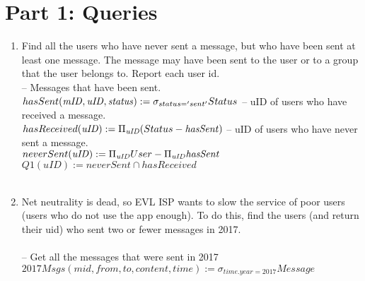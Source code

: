 \documentclass{article}
\newcommand{\var}[1]{\mathit{#1}}
\begin{document}
\section*{Part 1: Queries}

\begin{enumerate}

\item   %
Find all the users who have never sent a message, but who have been sent at least one message. The message may have been sent to the user or to a group that the user belongs to. Report each user id. \\

{\large %
--  Messages that have been sent. \\ [5pt]
$
hasSent(\var{mID}, \var{uID}, \var{status}) :=  
	\sigma_{status = 'sent'} 
	Status \\[10pt]
$
-- uID of users who have received a message. \\[5pt]
$
hasReceived(\var{uID}) := 
	\Pi_{\var{uID}} 
	(Status - \var{hasSent}) 
	\\[10pt]
$
-- uID of users who have never sent a message. \\[5pt]
$
neverSent(\var{uID}) := 
	\Pi_{\var{uID}} User - \Pi_\var{uID}\var{hasSent} 
	\\[10pt]
$
$
Q1(\var{uID}) :=
	neverSent \cap hasReceived
$\\\\ %

} %


\item   %
Net neutrality is dead, so EVL ISP wants to slow the service of poor users (users who do not use the app enough). To do this, find the users (and return their uid) who sent two or fewer messages in 2017.\\\\
{\large
\hspace*{1cm} -- Get all the messages that were sent in 2017 \\ [5pt]
$
2017Msgs(\var{mid}, \var{from}, \var{to}, \var{content}, \var{time}) :=
	\sigma_{time.year = 2017} Message
$\\

}
\end{enumerate}
\end{document}
